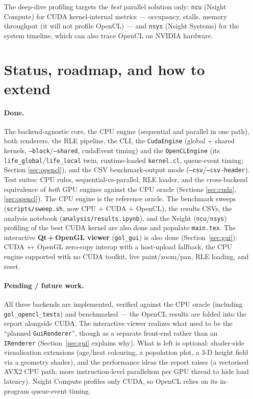 \documentclass[
	english,
	letterpaper, oneside
]{article}
\begin{document}
The deep-dive profiling targets the \emph{best} parallel solution only:
\texttt{ncu} (Nsight Compute) for CUDA kernel-internal metrics --- occupancy,
stalls, memory throughput (it will not profile OpenCL) --- and \texttt{nsys}
(Nsight Systems) for the system timeline, which can also trace OpenCL on NVIDIA
hardware.

\section{Status, roadmap, and how to extend}
\label{sec:roadmap}

\paragraph{Done.} The backend-agnostic core, the CPU engine (sequential and
parallel in one path), both renderers, the RLE pipeline, the CLI, the
\texttt{CudaEngine} (global + shared kernels, \texttt{--block}/\texttt{--shared},
cudaEvent timing) and the \texttt{OpenCLEngine} (its
\texttt{life\_global}/\texttt{life\_local} twin, runtime-loaded \texttt{kernel.cl},
queue-event timing; Section \ref{sec:opencl}), and the CSV benchmark-output mode
(\texttt{--csv}/\texttt{--csv-header}). Test suites: CPU rules,
sequential-vs-parallel, RLE loader, and the cross-backend equivalence of \emph{both}
GPU engines against the CPU oracle (Sections \ref{sec:cuda}, \ref{sec:opencl}). The
CPU engine is the reference oracle. The benchmark sweeps (\texttt{scripts/sweep.sh},
now CPU + CUDA + OpenCL), the results CSVs, the analysis notebook
(\texttt{analysis/results.ipynb}), and the Nsight (\texttt{ncu}/\texttt{nsys})
profiling of the best CUDA kernel are also done and populate \texttt{main.tex}.
The interactive \textbf{Qt\,+\,OpenGL viewer} (\texttt{gol\_gui}) is also done
(Section~\ref{sec:gui}): CUDA\,$\leftrightarrow$\,OpenGL zero-copy interop with a
host-upload fallback, the CPU engine supported with no CUDA toolkit, live
paint/zoom/pan, RLE loading, and reset.

\paragraph{Pending / future work.} All three backends are implemented, verified
against the CPU oracle (including \texttt{gol\_opencl\_tests}) and benchmarked --- the
OpenCL results are folded into the report alongside CUDA. The interactive viewer
realizes what used to be the ``planned \texttt{GuiRenderer}'', though as a separate
front-end rather than an \texttt{IRenderer} (Section~\ref{sec:gui} explains why). What
is left is optional: shader-side visualisation extensions (age/heat colouring, a
population plot, a 3-D height field via a geometry shader), and the performance ideas
the report raises (a vectorised AVX2 CPU path; more instruction-level parallelism per
GPU thread to hide load latency). Nsight Compute profiles only CUDA, so OpenCL relies
on its in-program queue-event timing.
\end{document}
